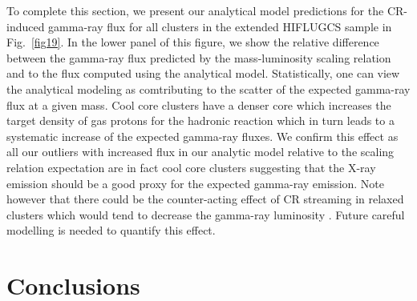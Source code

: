 \documentclass[10pt,aps,pra,reprint,amsmath,amsfonts,amssymb,showpacs,nofootinbib,floatfix]{revtex4-1}
\def\del#1{{}}
\newcommand{\rmn}{\mathrm}
\newcommand{\tev}{\rmn{TeV}}
\newcommand{\e}{\rmn{e}}
\newcommand{\eg}{E_\gamma}
\begin{document}
To complete this section, we present our analytical model predictions
for the CR-induced gamma-ray flux for all clusters in the extended
HIFLUGCS sample in Fig.~\ref{fig19}. In the lower panel of this
figure, we show the relative difference between the gamma-ray flux
predicted by the mass-luminosity scaling relation and to the flux
computed using the analytical model. Statistically, one can view the
analytical modeling as comtributing to the scatter of the expected
gamma-ray flux at a given mass. Cool core clusters have a denser core
which increases the target density of gas protons for the hadronic
reaction which in turn leads to a systematic increase of the expected
gamma-ray fluxes. We confirm this effect as all our outliers with
increased flux in our analytic model relative to the scaling relation
expectation are in fact cool core clusters suggesting that the X-ray
emission should be a good proxy for the expected gamma-ray
emission. Note however that there could be the counter-acting effect
of CR streaming in relaxed clusters which would tend to decrease the
gamma-ray luminosity \cite{2011A&A...527A..99E}. Future careful
modelling is needed to quantify this effect.


\del{
ANDERS: do you need this?
--) The dust turns up at about a factor 100 lower than the stars
--) The other figure show the spectral shape of the IC-star with the same
spectral shape as the dust, it shows the same gamma-ray slope as the dust
--) The reason why there is only a factor 10 difference in the break in the
gamma-ray emission between the star and dust is related to the KN. In our CRp
paper, the last figure shows that at $\eg=100\,\tev$, the spectra is suppressed
with about a factor 10 (also depends on $\alpha_\e$). Since the dust photons
have a factor 10 higher energy, I expect this suppression at about 10~TeV. For
star photons the suppression should be at 100~GeV. So the star photons are
definitely KN suppressed, which explains the earlier break and the steeper
slope.
}


%



\section{Conclusions}
\end{document}
